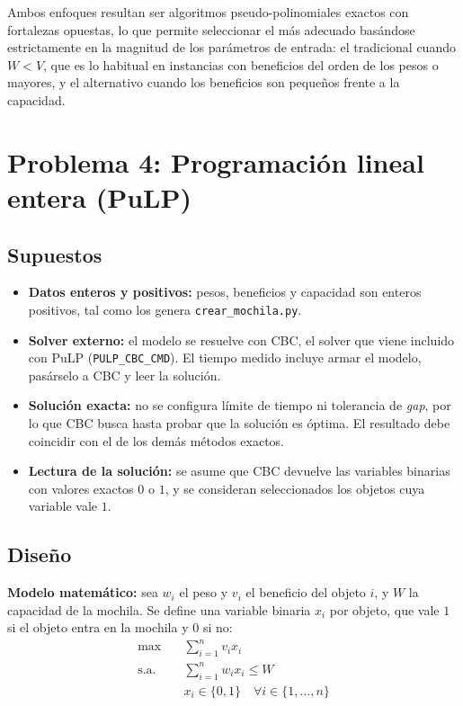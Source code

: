 \documentclass[11pt,a4paper]{article}
\begin{document}
Ambos enfoques resultan ser algoritmos pseudo-polinomiales exactos con fortalezas opuestas, lo que permite seleccionar el más adecuado basándose estrictamente en la magnitud de los parámetros de entrada: el tradicional cuando $W < V$, que es lo habitual en instancias con beneficios del orden de los pesos o mayores, y el alternativo cuando los beneficios son pequeños frente a la capacidad.

\newpage

\section{Problema 4: Programación lineal entera (PuLP)}
\label{sec:problema4}

\subsection{Supuestos}
\begin{itemize}
    \item \textbf{Datos enteros y positivos:} pesos, beneficios y capacidad son enteros positivos, tal como los genera \texttt{crear\_mochila.py}.
    \item \textbf{Solver externo:} el modelo se resuelve con CBC, el solver que viene incluido con PuLP (\texttt{PULP\_CBC\_CMD}). El tiempo medido incluye armar el modelo, pasárselo a CBC y leer la solución.
    \item \textbf{Solución exacta:} no se configura límite de tiempo ni tolerancia de \textit{gap}, por lo que CBC busca hasta probar que la solución es óptima. El resultado debe coincidir con el de los demás métodos exactos.
    \item \textbf{Lectura de la solución:} se asume que CBC devuelve las variables binarias con valores exactos $0$ o $1$, y se consideran seleccionados los objetos cuya variable vale $1$.
\end{itemize}

\subsection{Diseño}
\textbf{Modelo matemático:} sea $w_i$ el peso y $v_i$ el beneficio del objeto $i$, y $W$ la capacidad de la mochila. Se define una variable binaria $x_i$ por objeto, que vale $1$ si el objeto entra en la mochila y $0$ si no:
\begin{align*}
    \max \quad & \sum_{i=1}^{n} v_i x_i \\
    \text{s.a.} \quad & \sum_{i=1}^{n} w_i x_i \le W \\
    & x_i \in \{0, 1\} \quad \forall i \in \{1, \dots, n\}
\end{align*}
\end{document}
